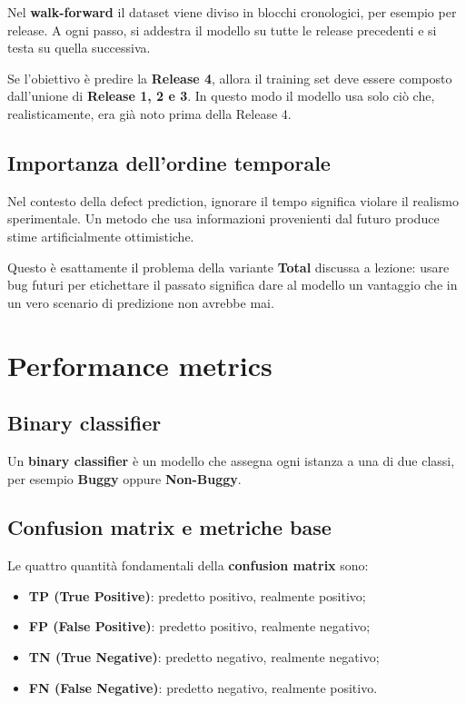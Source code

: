 Nel \textbf{walk-forward} il dataset viene diviso in blocchi cronologici, per esempio per release. A ogni passo, si addestra il modello su tutte le release precedenti e si testa su quella successiva.

\begin{notaprof}
Se l'obiettivo è predire la \textbf{Release 4}, allora il training set deve essere composto dall'unione di \textbf{Release 1, 2 e 3}. In questo modo il modello usa solo ciò che, realisticamente, era già noto prima della Release 4.
\end{notaprof}

\subsection{Importanza dell'ordine temporale}

Nel contesto della defect prediction, ignorare il tempo significa violare il realismo sperimentale. Un metodo che usa informazioni provenienti dal futuro produce stime artificialmente ottimistiche.

\begin{notaprof}
Questo è esattamente il problema della variante \textbf{Total} discussa a lezione: usare bug futuri per etichettare il passato significa dare al modello un vantaggio che in un vero scenario di predizione non avrebbe mai.
\end{notaprof}

\section{Performance metrics}

\subsection{Binary classifier}

Un \textbf{binary classifier} è un modello che assegna ogni istanza a una di due classi, per esempio \textbf{Buggy} oppure \textbf{Non-Buggy}.

\subsection{Confusion matrix e metriche base}

Le quattro quantità fondamentali della \textbf{confusion matrix} sono:

\begin{itemize}
    \item \textbf{TP (True Positive)}: predetto positivo, realmente positivo;
    \item \textbf{FP (False Positive)}: predetto positivo, realmente negativo;
    \item \textbf{TN (True Negative)}: predetto negativo, realmente negativo;
    \item \textbf{FN (False Negative)}: predetto negativo, realmente positivo.
\end{itemize}

